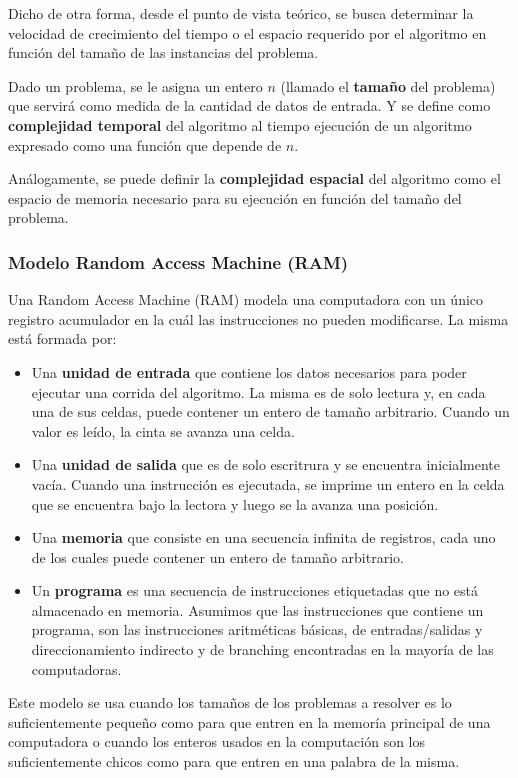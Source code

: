 Dicho de otra forma, desde el punto de vista teórico, se busca determinar la velocidad de crecimiento del tiempo o el espacio requerido por el algoritmo en función del tamaño de las instancias del problema.

Dado un problema, se le asigna un entero \(n\) (llamado el \textbf{tamaño} del problema) que servirá como medida de la cantidad de datos de entrada. Y se define como \textbf{complejidad temporal} del algoritmo al tiempo ejecución de un algoritmo expresado como una función que depende de \(n\).

Análogamente, se puede definir la \textbf{complejidad espacial} del algoritmo como el espacio de memoria necesario para su ejecución en función del tamaño del problema.

\subsubsection{Modelo Random Access Machine (RAM)}
Una Random Access Machine (RAM) modela una computadora con un único registro acumulador en la cuál las instrucciones no pueden modificarse. La misma está formada por:

\begin{itemize}
	\item Una \textbf{unidad de entrada} que contiene los datos necesarios para poder ejecutar una corrida del algoritmo. La misma es de solo lectura y, en cada una de sus celdas, puede contener un entero de tamaño arbitrario. Cuando un valor es leído, la cinta se avanza una celda.
	\item Una \textbf{unidad de salida} que es de solo escritrura y se encuentra inicialmente vacía. Cuando una instrucción es ejecutada, se imprime un entero en la celda que se encuentra bajo la lectora y luego se la avanza una posición.
	\item Una \textbf{memoria} que consiste en una secuencia infinita de registros, cada uno de los cuales puede contener un entero de tamaño arbitrario. 
	\item Un \textbf{programa} es una secuencia de instrucciones etiquetadas que no está almacenado en memoria. Asumimos que las instrucciones que contiene un programa, son las instrucciones aritméticas básicas, de entradas/salidas y direccionamiento indirecto y de branching encontradas en la mayoría de las computadoras.
\end{itemize}

Este modelo se usa cuando los tamaños de los problemas a resolver es lo suficientemente pequeño como para que entren en la memoría principal de una computadora o cuando los enteros usados en la computación son los suficientemente chicos como para que entren en una palabra de la misma.

